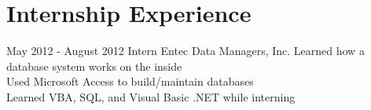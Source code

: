 \documentclass[]{resume-class}
\begin{document}
\section{Internship Experience}

\begin{entrylist}
  \entry
    {May 2012 - August 2012}
    {Intern}
    {Entec Data Managers, Inc.}
    {Learned how a database system works on the inside\\
    Used Microsoft Access to build/maintain databases\\
    Learned VBA, SQL, and Visual Basic .NET while interning}
\end{entrylist}
\end{document}
